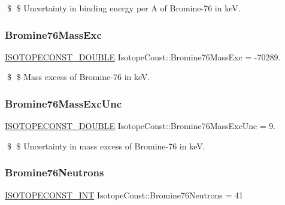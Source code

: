 \$ \$ Uncertainty in binding energy per A of Bromine-\/76 in keV. \mbox{\label{group___isotope_const-_bromine-_br76_ga374b52c3b2937c98a0deb590ee7a61b9}} 
\subsubsection{\texorpdfstring{Bromine76\+Mass\+Exc}{Bromine76MassExc}}
{\footnotesize\ttfamily \mbox{\hyperlink{group___isotope_const-_macros_ga8f45a7272ce02c0b4c65c44636ed719a}{I\+S\+O\+T\+O\+P\+E\+C\+O\+N\+S\+T\+\_\+\+D\+O\+U\+B\+LE}} Isotope\+Const\+::\+Bromine76\+Mass\+Exc = -\/70289.}

\$ \$ Mass excess of Bromine-\/76 in keV. \mbox{\label{group___isotope_const-_bromine-_br76_gad9fd6139a23cf54d541e1ec05097b160}} 
\subsubsection{\texorpdfstring{Bromine76\+Mass\+Exc\+Unc}{Bromine76MassExcUnc}}
{\footnotesize\ttfamily \mbox{\hyperlink{group___isotope_const-_macros_ga8f45a7272ce02c0b4c65c44636ed719a}{I\+S\+O\+T\+O\+P\+E\+C\+O\+N\+S\+T\+\_\+\+D\+O\+U\+B\+LE}} Isotope\+Const\+::\+Bromine76\+Mass\+Exc\+Unc = 9.}

\$ \$ Uncertainty in mass excess of Bromine-\/76 in keV. \mbox{\label{group___isotope_const-_bromine-_br76_ga3abd2a806aa35d62983c6592e49e954d}} 
\subsubsection{\texorpdfstring{Bromine76\+Neutrons}{Bromine76Neutrons}}
{\footnotesize\ttfamily \mbox{\hyperlink{group___isotope_const-_macros_ga5f18360b3e99483a35c32d789e62621c}{I\+S\+O\+T\+O\+P\+E\+C\+O\+N\+S\+T\+\_\+\+I\+NT}} Isotope\+Const\+::\+Bromine76\+Neutrons = 41}

